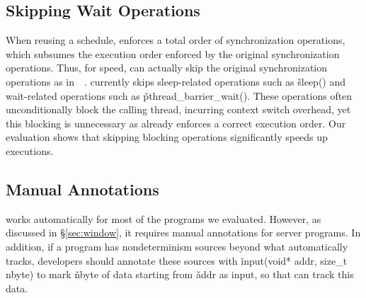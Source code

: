 \subsection{Skipping Wait Operations} \label{sec:nowait}

When reusing a schedule, \peregrine enforces a total order of synchronization
operations, which subsumes the execution order enforced by the original
synchronization operations.  Thus, for speed, \peregrine can actually skip the
original synchronization operations as in~~\cite{cui:tern:osdi10}.
\peregrine currently skips sleep-related operations
such as \v{sleep()} and wait-related operations such as
\v{pthread\_barrier\_wait()}.  These operations often unconditionally block
the calling thread, incurring context switch overhead, yet this blocking
is unnecessary as \peregrine already enforces a correct execution order.  Our
evaluation shows that skipping blocking operations significantly speeds
up executions.

\subsection{Manual Annotations} \label{sec:func-summary}

\peregrine works automatically for most of the programs we evaluated.  However,
as discussed in \S\ref{sec:window}, it requires manual annotations for
server programs.  In addition, if a program has nondeterminism sources
beyond what \peregrine automatically tracks, developers should annotate these
sources with \v{input(void* addr, size\_t nbyte)} to mark \v{nbyte} of
data starting from \v{addr} as input, so that \peregrine can track this
data.

